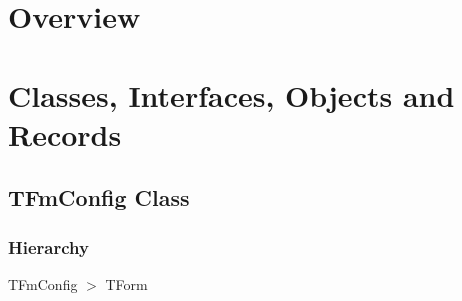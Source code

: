 \documentclass{report}
\newif\ifpdf
\begin{document}
\section{Overview}
\begin{description}
\item[\texttt{\begin{ttfamily}TFmConfig\end{ttfamily} Class}]
\end{description}
\section{Classes, Interfaces, Objects and Records}
\ifpdf
\subsection*{\large{\textbf{TFmConfig Class}}\normalsize\hspace{1ex}\hrulefill}
\else
\subsection*{TFmConfig Class}
\fi
\label{settings.TFmConfig}
\subsubsection*{\large{\textbf{Hierarchy}}\normalsize\hspace{1ex}\hfill}
TFmConfig {$>$} TForm
\end{document}

